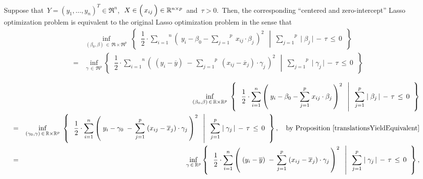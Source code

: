 \vskip 0.5cm
\begin{theorem}
\label{CanCenterAndRemoveIntercept}
\mbox{}
\vskip 0.0cm
\noindent
Suppose that
\,$Y = (y_{1},\ldots,y_{n})^{T} \in \Re^{n}$,\,
\,$X \in \left(\,\overset{{\color{white}-}}{x_{ij}}\,\right)\in\Re^{n \times p}$\, and
\,$\tau > 0$.\,
Then, the corresponding ``centered and zero-intercept'' Lasso optimization problem is equivalent to
the original Lasso optimization problem in the sense that
\begin{eqnarray*}
&&
	\underset{(\beta_{0},\beta)\,\in\,\Re\times\Re^{p}}{\inf}\;
	\left\{\;\;
		\left.
		\dfrac{1}{2}
		\cdot
		\overset{n}{\underset{i=1}{\sum}}
		\left(\; y_{i} - \beta_{0} - \overset{p}{\underset{j=1}{\sum}}\; x_{ij}\cdot\beta_{j}\,\right)^{2}
		\;\;\,\right\vert\;\;
		\overset{p}{\underset{j=1}{\sum}}\;
		\vert\;\beta_{j}\,\vert
		\, - \,
		\tau \, \leq \, 0
		\;\;\right\}
\\
& = &
	\underset{\gamma\,\in\,\Re^{p}}{\inf}
	\left\{\;\;
		\left.
		\dfrac{1}{2}
		\cdot
		\overset{n}{\underset{i=1}{\sum}}
		\left(\; (y_{i} - \overline{y}) \;-\, \overset{p}{\underset{j=1}{\sum}}\; (x_{ij}-\overline{x}_{j})\cdot\gamma_{j}\,\right)^{2}
		\;\;\,\right\vert\;\;
		\overset{p}{\underset{j=1}{\sum}}\;
		\vert\;\gamma_{j}\,\vert
		\, - \,
		\tau \, \leq \, 0
		\;\;\right\}
\end{eqnarray*}
\end{theorem}
\proof
\begin{eqnarray*}
&&
	\underset{(\beta_{0},\beta)\,\in\,\Re\times\Re^{p}}{\inf}\;
	\left\{\;\;
		\left.
		\dfrac{1}{2}
		\cdot
		\overset{n}{\underset{i=1}{\sum}}
		\left(\; y_{i} - \beta_{0} - \overset{p}{\underset{j=1}{\sum}}\; x_{ij}\cdot\beta_{j}\,\right)^{2}
		\;\;\,\right\vert\;\;
		\overset{p}{\underset{j=1}{\sum}}\;
		\vert\;\beta_{j}\,\vert
		\, - \,
		\tau \, \leq \, 0
		\;\;\right\}
\\
& = &
	\underset{(\gamma_{0},\gamma)\,\in\,\Re\times\Re^{p}}{\inf}\;
	\left\{\;\;
		\left.
		\dfrac{1}{2}
		\cdot
		\overset{n}{\underset{i=1}{\sum}}
		\left(\; y_{i} - \gamma_{0} \;-\, \overset{p}{\underset{j=1}{\sum}}\; (x_{ij}-\overline{x}_{j})\cdot\gamma_{j}\,\right)^{2}
		\;\;\,\right\vert\;\;
		\overset{p}{\underset{j=1}{\sum}}\;
		\vert\;\gamma_{j}\,\vert
		\, - \,
		\tau \, \leq \, 0
		\;\;\right\},
	\quad
	\textnormal{by Proposition \ref{translationsYieldEquivalent}}
\\
& = &
	\underset{\gamma\,\in\,\Re^{p}}{\inf}
	\left\{\;\;
		\left.
		\dfrac{1}{2}
		\cdot
		\overset{n}{\underset{i=1}{\sum}}
		\left(\; (y_{i} - \overline{y}) \;-\, \overset{p}{\underset{j=1}{\sum}}\; (x_{ij}-\overline{x}_{j})\cdot\gamma_{j}\,\right)^{2}
		\;\;\,\right\vert\;\;
		\overset{p}{\underset{j=1}{\sum}}\;
		\vert\;\gamma_{j}\,\vert
		\, - \,
		\tau \, \leq \, 0
		\;\;\right\},
\end{eqnarray*}
